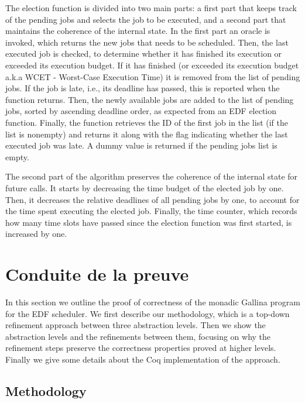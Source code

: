 			The election function is divided into two main parts: a first part that keeps track of the pending jobs and selects the job to be executed, and a second part that maintains the coherence of the internal state. In the first part an oracle is invoked, which returns the new jobs that needs to be scheduled. Then, the last executed job is checked, to determine whether it has finished its execution or exceeded its execution budget. If it has finished (or exceeded its execution budget a.k.a WCET - Worst-Case Execution Time) it is removed from the list of pending jobs. If the job is late, i.e., its deadline has passed, this is reported when the function returns. Then, the newly available jobs are added to the list of pending jobs, sorted by ascending deadline order, as expected from an EDF election function. Finally, the function retrieves the ID of the first job in the list (if the list is nonempty) and returns it along with the flag indicating whether the last executed job was late. A dummy value is returned if the pending jobs list is empty.

			The second part of the algorithm preserves the coherence of the internal state for future calls. It starts by decreasing the time budget of the elected job by one. Then, it decreases the relative deadlines of all pending jobs by one, to account for the time spent executing the elected job. Finally, the time counter, which records how many time slots have passed since the election function was first started, is increased by one.


	\section{Conduite de la preuve}

	\label{sec:proof}
	In this section we outline the proof of correctness of the monadic Gallina program for the EDF scheduler.
	We first describe our methodology, which is a top-down refinement approach between three abstraction levels. Then we show the abstraction levels and the refinements between them, focusing on why the refinement steps preserve the correctness properties proved at higher levels. Finally we give some details about the Coq implementation of the approach.


	\subsection{Methodology}

